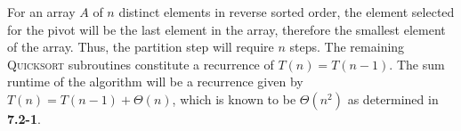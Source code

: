 For an array $ A $ of $ n $ distinct elements in reverse sorted order, the element selected for the pivot will be the last element in the array, therefore the smallest element of the array. Thus, the partition step will require $ n $ steps. The remaining \textsc{Quicksort} subroutines constitute a recurrence of $ T(n) = T(n - 1) $. The sum runtime of the algorithm will be a recurrence given by $ T(n) = T(n-1) + \Theta(n) $, which is known to be $ \Theta(n^2) $ as determined in \textbf{7.2-1}.